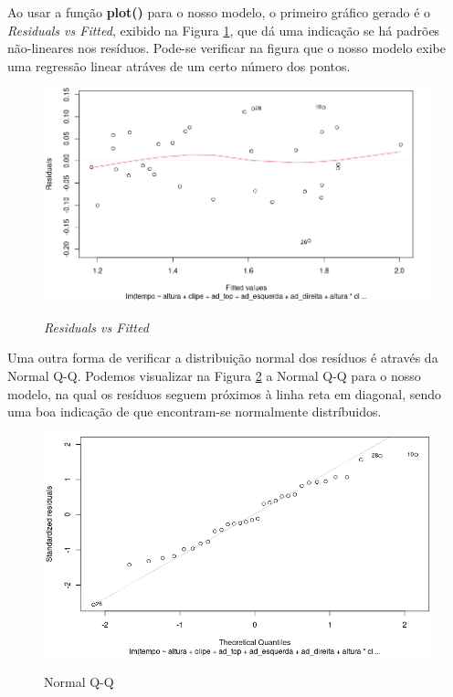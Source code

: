 Ao usar a função \textbf{plot()} para o nosso modelo, o primeiro gráfico gerado é o \textit{Residuals vs Fitted}, exibido na Figura \ref{fig:fitted}, que dá uma indicação se há padrões não-lineares nos resíduos. Pode-se verificar na figura que o nosso modelo exibe uma regressão linear atráves de um certo número dos pontos.

\begin{figure}[H]
\caption{\textit{Residuals vs Fitted}}
\center 
\includegraphics[scale=0.48]{images/fitted.png}
\label{fig:fitted}
\end{figure}

Uma outra forma de verificar a distribuição normal dos resíduos é através da Normal Q-Q. Podemos visualizar na Figura \ref{fig:qq} a Normal Q-Q para o nosso modelo, na qual os resíduos seguem próximos à linha reta em diagonal, sendo uma boa indicação de que encontram-se normalmente distríbuidos.

\begin{figure}[H]
  \caption{Normal Q-Q}
  \center
  \includegraphics[scale=0.48]{images/qq.png}
  \label{fig:qq}
\end{figure}

